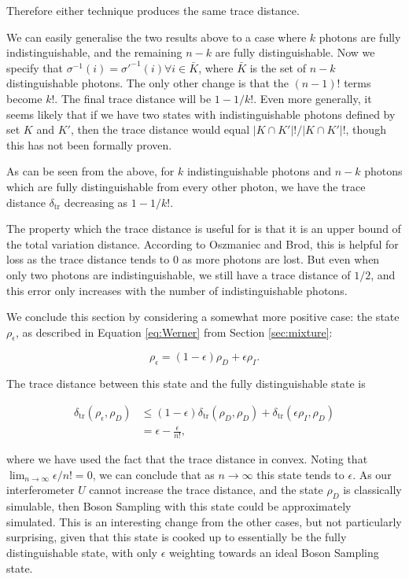 \noindent Therefore either technique produces the same trace distance.

We can easily generalise the two results above to a case where $k$ photons are fully indistinguishable, and the remaining $n-k$ are fully distinguishable. Now we specify that $\sigma^{-1}(i)=\sigma'^{-1}(i)\forall i \in \bar{K}$, where $\bar{K}$ is the set of $n-k$ distinguishable photons. The only other change is that the $(n-1)!$ terms become $k!$. The final trace distance will be $1-1/k!$. Even more generally, it seems likely that if we have two states with indistinguishable photons defined by set $K$ and $K'$, then the trace distance would equal $|K\cap K'|!/|K\cap K'|!$, though this has not been formally proven.

As can be seen from the above, for $k$ indistinguishable photons and $n-k$ photons which are fully distinguishable from every other photon, we have the trace distance $\delta_{\mathrm{tr}}$ decreasing as $1 - 1/k!$.

The property which the trace distance is useful for is that it is an upper bound of the total variation distance. According to Oszmaniec and Brod, this is helpful for loss as the trace distance tends to $0$ as more photons are lost. But even when only two photons are indistinguishable, we still have a trace distance of $1/2$, and this error only increases with the number of indistinguishable photons.

We conclude this section by considering a somewhat more positive case: the state $\rho_\epsilon$, as described in Equation \ref{eq:Werner} from Section \ref{sec:mixture}:

\begin{equation}
\rho_\epsilon = (1-\epsilon)\rho_D + \epsilon\rho_I.
\end{equation}

The trace distance between this state and the fully distinguishable state is

\begin{align}
\delta_{\textrm{tr}}(\rho_\epsilon,\rho_D) &\leq (1-\epsilon)\delta_{\textrm{tr}}(\rho_D,\rho_D) + \delta_{\textrm{tr}}(\epsilon\rho_I,\rho_D)\\
&= \epsilon-\frac{\epsilon}{n!},
\end{align}

\noindent where we have used the fact that the trace distance in convex. Noting that $\lim_{n\rightarrow\infty}\epsilon/n! = 0$, we can conclude that as $n\rightarrow\infty$ this state tends to $\epsilon$. As our interferometer $U$ cannot increase the trace distance, and the state $\rho_D$ is classically simulable, then Boson Sampling with this state could be approximately simulated. This is an interesting change from the other cases, but not particularly surprising, given that this state is cooked up to essentially be the fully distinguishable state, with only $\epsilon$ weighting towards an ideal Boson Sampling state.

